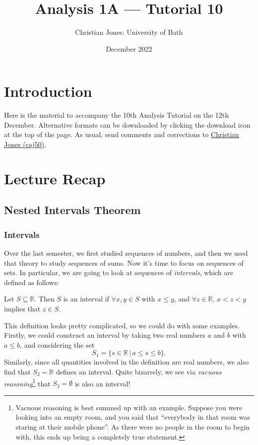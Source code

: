 \documentclass[
  17pt,
  a4paper]{extarticle}
\title{Analysis 1A --- Tutorial 10}
\author{Christian Jones: University of Bath}
\date{December 2022}
\theoremstyle{plain}
\theoremstyle{plain}
\theoremstyle{plain}
\theoremstyle{plain}
\theoremstyle{plain}
\theoremstyle{definition}
\theoremstyle{definition}
\theoremstyle{definition}
\theoremstyle{remark}
\let\BeginKnitrBlock\begin \let\EndKnitrBlock\end
\renewcommand{\;}{\,}
\begin{document}
\maketitle

{
\setcounter{tocdepth}{2}
\tableofcontents
}
\newpage
{}

\hypertarget{introduction}{%
\section*{Introduction}\label{introduction}}

Here is the material to accompany the 10th Analysis Tutorial on the 12th December. Alternative formats can be downloaded by clicking the download icon at the top of the page. As usual, send comments and corrections to \href{mailto:caj50@bath.ac.uk}{Christian Jones (caj50)}.

\hypertarget{lecture-recap}{%
\section{Lecture Recap}\label{lecture-recap}}

\hypertarget{nested-intervals-theorem}{%
\subsection{Nested Intervals Theorem}\label{nested-intervals-theorem}}

\hypertarget{intervals}{%
\subsubsection{Intervals}\label{intervals}}

Over the last semester, we first studied sequences of numbers, and then we used that theory to study sequences of sums. Now it's time to focus on sequences of sets. In particular, we are going to look at sequences of \emph{intervals}, which are defined as follows:

\BeginKnitrBlock{definition}[Interval]
{\label{def:def1} }Let \(S \subseteq \mathbb{R}\). Then \(S\) is an interval if \(\forall x,y \in S\) with \(x \leq y\), and \(\forall z \in \mathbb{R}\), \(x < z < y\) implies that \(z \in S\).
\EndKnitrBlock{definition}
This definition looks pretty complicated, so we could do with some examples. Firstly, we could construct an interval by taking two real numbers \(a\) and \(b\) with \(a \leq b\), and considering the set \[S_1 = \lbrace s \in \mathbb{R}\; \lvert\; a \leq s \leq b \rbrace.\] Similarly, since all quantities involved in the definition are real numbers, we also find that \(S_2 = \mathbb{R}\) defines an interval. Quite bizarrely, we see via \emph{vacuous reasoning}\footnote{Vacuous reasoning is best summed up with an example. Suppose you were looking into an empty room, and you said that ``everybody in that room was staring at their mobile phone''. As there were no people in the room to begin with, this ends up being a completely true statement.} that \(S_3 = \emptyset\) is also an interval!
\end{document}
